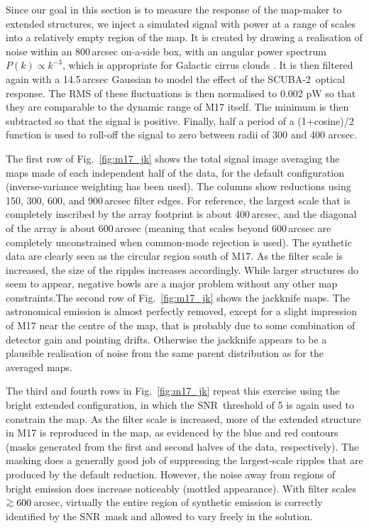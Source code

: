 \documentclass[useAMS,usenatbib,nofootinbib]{mn2e}
\newcommand{\snr}{SNR}
\newcommand{\scuba}{SCUBA-2}
\def\gsim{\mathrel{\lower2.5pt\vbox{\lineskip=0pt\baselineskip=0pt
          \hbox{$>$}\hbox{$\sim$}}}}
\begin{document}
Since our goal in this section is to measure the response of the
map-maker to extended structures, we inject a simulated signal with
power at a range of scales into a relatively empty region of the map.
It is created by drawing a realisation of noise within an 800\,arcsec
on-a-side box, with an angular power spectrum $P(k) \propto k^{-3}$,
which is appropriate for Galactic cirrus clouds
\citep[e.g.,][]{gautier1992}. It is then filtered again with a
14.5\,arcsec Gaussian to model the effect of the \scuba\ optical
response. The RMS of these fluctuations is then normalised to 0.002 pW
so that they are comparable to the dynamic range of M17 itself. The
minimum is then subtracted so that the signal is positive. Finally,
half a period of a (1+cosine)/2 function is used to roll-off the
signal to zero between radii of 300 and 400 arcsec.

The first row of Fig.~\ref{fig:m17_jk} shows the total signal image
averaging the maps made of each independent half of the data, for the
default configuration (inverse-variance weighting has been used). The
columns show reductions using 150, 300, 600, and 900\,arcsec filter
edges. For reference, the largest scale that is completely inscribed
by the array footprint is about 400\,arcsec, and the diagonal of the
array is about 600\,arcsec (meaning that scales beyond 600\,arcsec are
completely unconstrained when common-mode rejection is used).  The
synthetic data are clearly seen as the circular region south of
M17. As the filter scale is increased, the size of the ripples
increases accordingly. While larger structures do seem to appear,
negative bowls are a major problem without any other map
constraints.The second row of Fig.~\ref{fig:m17_jk} shows the
jackknife maps. The astronomical emission is almost perfectly removed,
except for a slight impression of M17 near the centre of the map, that
is probably due to some combination of detector gain and pointing
drifts. Otherwise the jackknife appears to be a plausible realisation
of noise from the same parent distribution as for the averaged maps.

The third and fourth rows in Fig.~\ref{fig:m17_jk} repeat this
exercise using the bright extended configuration, in which the \snr\
threshold of 5 is again used to constrain the map. As the filter scale
is increased, more of the extended structure in M17 is reproduced in
the map, as evidenced by the blue and red contours (masks generated
from the first and second halves of the data, respectively). The
masking does a generally good job of suppressing the largest-scale
ripples that are produced by the default reduction. However, the noise
away from regions of bright emission does increase noticeably (mottled
appearance). With filter scales $\gsim600$\,arcsec, virtually the
entire region of synthetic emission is correctly identified by the \snr\
mask and allowed to vary freely in the solution.
\end{document}

